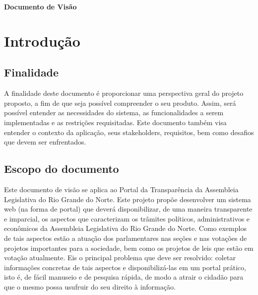 \documentclass[12pt, a4paper]{article}
\begin{document}

    \newpage

    \begin{center}
      \Large\textbf{Documento de Visão}
    \end{center}

    \section{Introdução}
        \subsection{Finalidade}
        A finalidade deste documento é proporcionar uma perspectiva geral do
        projeto proposto, a fim de que seja possível compreender o seu produto.
        Assim, será possível entender as necessidades do sistema, as
        funcionalidades a serem implementadas e as restrições requisitadas.
        Este documento também visa entender o contexto da aplicação, seus
        stakeholders, requisitos, bem como desafios que devem ser enfrentados.

        \subsection{Escopo do documento}
        Este documento de visão se aplica ao Portal da Transparência da Assembleia
        Legislativa do Rio Grande do Norte. Este projeto propõe desenvolver um sistema
        web (na forma de portal) que deverá disponibilizar, de uma maneira transparente
        e imparcial, os aspectos que caracterizam os trâmites políticos,
        administrativos e econômicos da Assembleia Legislativa do Rio Grande do Norte.
        Como exemplos de tais aspectos estão a atuação dos parlamentares nas seções e
        nas votações de projetos importantes para a sociedade, bem como os projetos de
        leis que estão em votação atualmente. Eis o principal problema que deve ser
        resolvido: coletar informações concretas de tais aspectos e disponibilizá-las
        em um portal prático, isto é, de fácil manuseio e de pesquisa rápida, de modo a
        atrair o cidadão para que o mesmo possa usufruir do seu direito à informação.
\end{document}
